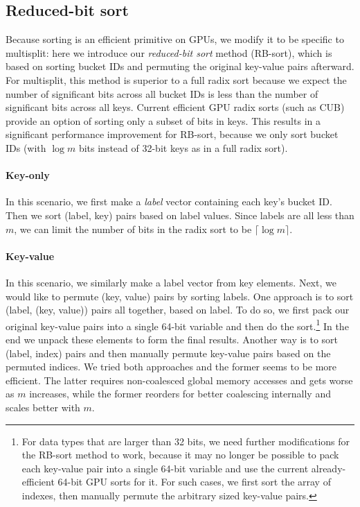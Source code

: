 \subsection{Reduced-bit sort}\label{sec:reduced_bit}
Because sorting is an efficient primitive on GPUs, we modify it to be specific to multisplit: here we introduce our \emph{reduced-bit sort} method (RB-sort), which is based on sorting bucket IDs and permuting the original key-value pairs afterward. For multisplit, this method is superior to a full radix sort because we expect the number of significant bits across all bucket IDs is less than the number of significant bits across all keys.
Current efficient GPU radix sorts (such as CUB) provide an option of sorting only a subset of bits in keys. This results in a significant performance improvement for RB-sort, because we only sort bucket IDs (with $\log m$ bits instead of 32-bit keys as in a full radix sort).

\paragraph{Key-only} In this scenario, we first make a \emph{label} vector containing each key's bucket ID\@. Then we sort (label, key) pairs based on label values. Since labels are all less than $m$, we can limit the number of bits in the radix sort to be $\lceil \log m \rceil$.
\paragraph{Key-value} In this scenario, we similarly make a label vector from key elements. Next, we would like to permute (key, value) pairs by sorting labels. One approach is to sort (label, (key, value)) pairs all together, based on label. To do so, we first pack our original key-value pairs into a single 64-bit variable and then do the sort.\footnote{For data types that are larger than 32 bits, we need further modifications for the RB-sort method to work, because it may no longer be possible to pack each key-value pair into a single 64-bit variable and use the current already-efficient 64-bit GPU sorts for it. For such cases, we first sort the array of indexes, then manually permute the arbitrary sized key-value pairs.}
In the end we unpack these elements to form the final results. Another way is to sort (label, index) pairs and then manually permute key-value pairs based on the permuted indices. We tried both approaches and the former seems to be more efficient. The latter requires non-coalesced global memory accesses and gets worse as $m$ increases, while the former reorders for better coalescing internally and scales better with $m$.


